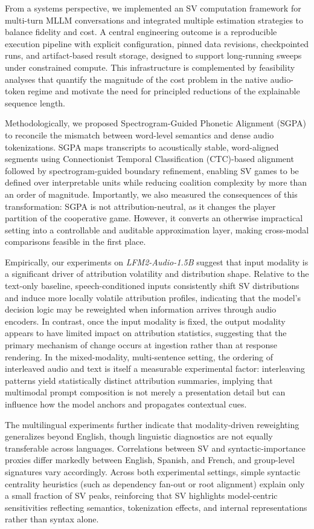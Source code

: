 From a systems perspective, we implemented an SV computation framework for multi-turn MLLM conversations and integrated multiple estimation strategies to balance fidelity and cost. A central engineering outcome is a reproducible execution pipeline with explicit configuration, pinned data revisions, checkpointed runs, and artifact-based result storage, designed to support long-running sweeps under constrained compute. This infrastructure is complemented by feasibility analyses that quantify the magnitude of the cost problem in the native audio-token regime and motivate the need for principled reductions of the explainable sequence length.

Methodologically, we proposed Spectrogram-Guided Phonetic Alignment (SGPA) to reconcile the mismatch between word-level semantics and dense audio tokenizations. SGPA maps transcripts to acoustically stable, word-aligned segments using Connectionist Temporal Classification (CTC)-based alignment followed by spectrogram-guided boundary refinement, enabling SV games to be defined over interpretable units while reducing coalition complexity by more than an order of magnitude. Importantly, we also measured the consequences of this transformation: SGPA is not attribution-neutral, as it changes the player partition of the cooperative game. However, it converts an otherwise impractical setting into a controllable and auditable approximation layer, making cross-modal comparisons feasible in the first place.

\newpage
Empirically, our experiments on \textit{LFM2-Audio-1.5B} suggest that input modality is a significant driver of attribution volatility and distribution shape. Relative to the text-only baseline, speech-conditioned inputs consistently shift SV distributions and induce more locally volatile attribution profiles, indicating that the model's decision logic may be reweighted when information arrives through audio encoders. In contrast, once the input modality is fixed, the output modality appears to have limited impact on attribution statistics, suggesting that the primary mechanism of change occurs at ingestion rather than at response rendering. In the mixed-modality, multi-sentence setting, the ordering of interleaved audio and text is itself a measurable experimental factor: interleaving patterns yield statistically distinct attribution summaries, implying that multimodal prompt composition is not merely a presentation detail but can influence how the model anchors and propagates contextual cues.

The multilingual experiments further indicate that modality-driven reweighting generalizes beyond English, though linguistic diagnostics are not equally transferable across languages. Correlations between SV and syntactic-importance proxies differ markedly between English, Spanish, and French, and group-level signatures vary accordingly. Across both experimental settings, simple syntactic centrality heuristics (such as dependency fan-out or root alignment) explain only a small fraction of SV peaks, reinforcing that SV highlights model-centric sensitivities reflecting semantics, tokenization effects, and internal representations rather than syntax alone.

